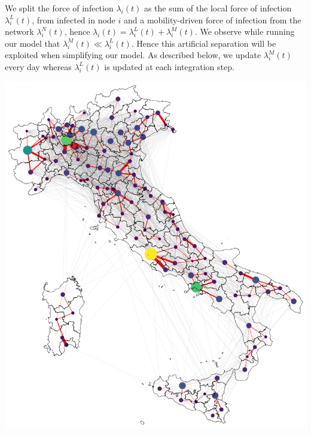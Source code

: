 We split the force of infection $\lambda_i(t)$ as the sum of the local force of infection $\lambda^L_i(t)$, from infected in node $i$ and a mobility-driven force of infection from the network $\lambda^N_i(t)$, hence $\lambda_i(t) = \lambda^L_i(t) + \lambda^M_i(t)$. We observe while running our model that $\lambda^M_i(t) \ll \lambda^L_i(t)$. Hence this artificial separation will be exploited when simplifying our model. As described below, we update $\lambda^M_i(t)$ every day whereas $\lambda^L_i(t)$ is updated at each integration step.
\begin{marginfigure}
\centering
\includegraphics{fig_italy-ocp/figures/map_nd.png}
    \label{fig:model_description_network}
\end{marginfigure}

